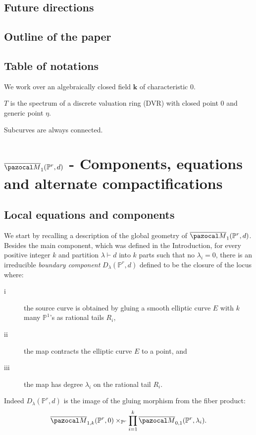 \documentclass[11pt]{amsart}
\newcommand{\M}[4]{\overline{\pazocal M}_{#1,#2}(#3,#4)}
\newcommand{\PP}{\mathbb P}
\renewcommand{\k}{\mathbf k}
\newcommand{\oM}{\overline{\pazocal M}}
\theoremstyle{plain}
\theoremstyle{definition}
\begin{document}
\subsection*{Future directions}

\subsection*{Outline of the paper}

\subsection*{Table of notations} We work over an algebraically closed field $\k$ of characteristic $0$.

$T$ is the spectrum of a discrete valuation ring (DVR) with closed point $0$ and generic point $\eta$.

Subcurves are always connected.

\section{$\oM_1(\PP^r,d)$ - Components, equations  and alternate compactifications}\label{sec:section1}

\subsection{Local equations and components}
We start by recalling a description of the global geometry of $\oM_1(\PP^r,d)$. Besides the main component, which was defined in the Introduction, for every positive integer $k$ and partition $\lambda\vdash d$ into $k$ parts such that no $\lambda_i=0$, there is an irreducible \emph{boundary component} $D_{\lambda}(\PP^r,d)$ defined to be the closure of the locus where:
\begin{description}
\item[i] the source curve is obtained by gluing a smooth elliptic curve $E$ with $k$ many $\PP^1$'s as rational tails $R_i$,
\item[ii] the map contracts the elliptic curve $E$ to a point, and
\item[iii] the map has degree $\lambda_i$ on the rational tail $R_i$.
\end{description}
Indeed $D_{\lambda}(\PP^r,d)$ is the image of the gluing morphism from the fiber product:
$$\M{1}{k}{\PP^r}{0}\times_{\PP^r}\prod_{i=1}^k\M{0}{1}{\PP^r}{\lambda_i}.$$
\end{document}
